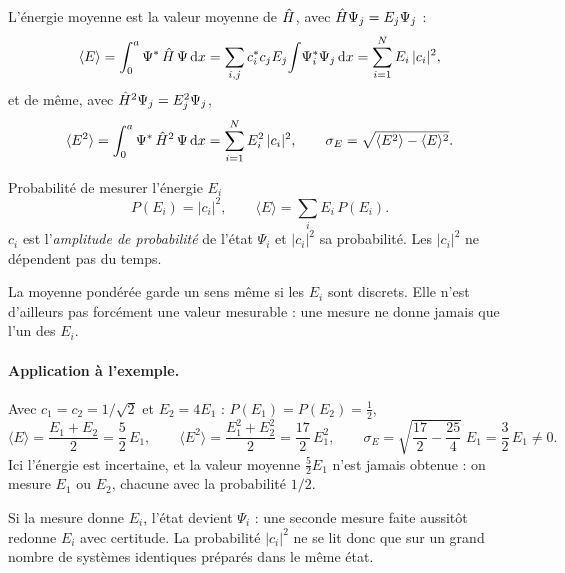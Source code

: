 L'énergie moyenne est la valeur moyenne de $\hat{H}$, avec $\hat{H}\Psi_j=E_j\Psi_j$ :
\[
  \langle E\rangle=\int_0^a\Psi^*\,\hat{H}\,\Psi\,\mathrm{d} x
  =\sum_{i,j}c_i^*c_jE_j\!\int\!\Psi_i^*\Psi_j\,\mathrm{d} x
  =\sum_{i=1}^{N}E_i\,|c_i|^2,
\]
et de même, avec $\hat{H}^{2}\Psi_j=E_j^2\Psi_j$,
\[
  \langle E^2\rangle=\int_0^a\Psi^*\,\hat{H}^{2}\,\Psi\,\mathrm{d} x=\sum_{i=1}^{N}E_i^2\,|c_i|^2 ,
  \qquad
  \sigma_E=\sqrt{\langle E^2\rangle-\langle E\rangle^2}.
\]

\begin{resultat}{Probabilité de mesurer l'énergie $E_i$}
\[
  P(E_i)=|c_i|^2 ,\qquad
  \langle E\rangle=\sum_i E_i\,P(E_i).
\]
$c_i$ est l'\emph{amplitude de probabilité} de l'état $\Psi_i$ et $|c_i|^2$ sa
probabilité. Les $|c_i|^2$ ne dépendent pas du temps.
\end{resultat}

La moyenne pondérée garde un sens même si les $E_i$ sont discrets. Elle n'est
d'ailleurs pas forcément une valeur mesurable : une mesure ne donne jamais que l'un des
$E_i$.

\paragraph{Application à l'exemple.} Avec $c_1=c_2=1/\sqrt2$ et $E_2=4E_1$ :
$P(E_1)=P(E_2)=\tfrac12$,
\[
  \langle E\rangle=\frac{E_1+E_2}{2}=\frac{5}{2}\,E_1,
  \qquad
  \langle E^2\rangle=\frac{E_1^2+E_2^2}{2}=\frac{17}{2}\,E_1^2,
  \qquad
  \sigma_E=\sqrt{\frac{17}{2}-\frac{25}{4}}\;E_1=\frac{3}{2}\,E_1\neq0 .
\]
Ici l'énergie est incertaine, et la valeur moyenne $\tfrac52E_1$ n'est jamais obtenue :
on mesure $E_1$ ou $E_2$, chacune avec la probabilité $1/2$.

\begin{remarque}[Effondrement]
Si la mesure donne $E_i$, l'état devient $\Psi_i$ : une seconde mesure faite
aussitôt redonne $E_i$ avec certitude. La probabilité $|c_i|^2$ ne se lit donc que sur
un grand nombre de systèmes identiques préparés dans le même état.
\end{remarque}

